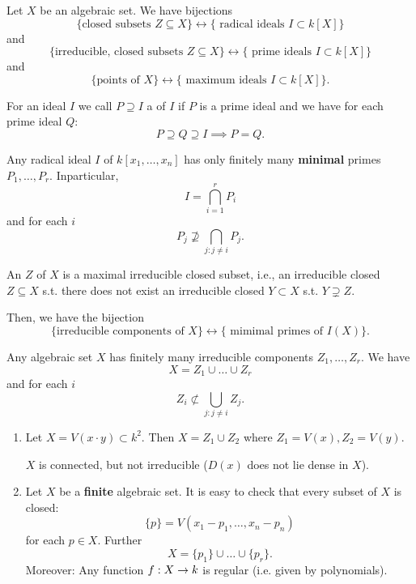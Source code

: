 \begin{lemma}
	Let $X$ be an algebraic set. We have bijections
	\[
	\{ \text{closed subsets } Z \subseteq X\} \leftrightarrow \{ \text{ radical ideals } I \subset k[X]\}
	\]
	and
	\[
	\{ \text{irreducible, closed subsets } Z \subseteq X\} \leftrightarrow \{ \text{ prime ideals } I \subset k[X]\}
	\]
		and
	\[
	\{ \text{points of } X\} \leftrightarrow \{ \text{ maximum ideals } I \subset k[X]\}.
	\]
\end{lemma}
\begin{lemma}
For an ideal $I$ we call $P \supseteq I$ a  of $I$ if $P$ is a prime ideal and we have for each prime ideal $Q$:
\[ P \supseteq Q \supseteq I \implies P = Q. \]

Any radical ideal $I $ of $k[x_1, \ldots, x_n]$ has only finitely many \textbf{minimal} primes $P_1,\ldots, P_r$.
Inparticular,
\[ I = \bigcap_{i=1}^r P_i \]
and for each $i$
\[ P_j \not \supseteq \bigcap_{j : j \neq i} P_j. \]
\end{lemma}

\begin{definition}
An  $Z$ of $X$ is a maximal irreducible closed subset, i.e., an irreducible closed $Z \subseteq X$ s.t. there does not exist an irreducible closed $Y \subset X$ s.t. $Y \supsetneq Z$.

Then, we have the bijection
	\[
\{ \text{irreducible components of } X\} \leftrightarrow \{ \text{ mimimal primes of } I(X)\}.
\]
\end{definition}

\begin{lemma}
Any algebraic set $X$ has finitely many irreducible components $Z_1, \ldots, Z_r$. We have
\[ X = Z_1 \cup \ldots \cup Z_r \]
and for each $i$
\[ Z_i \not \subset \bigcup_{j : j \neq i}Z_j. \]
\end{lemma}

\begin{example}
	\begin{enumerate}
		\item 	Let $X = V(x\cdot y) \subset k^2$. Then $X = Z_1\cup Z_2$ where $Z_1 = V(x), Z_2 = V(y)$.
		
		$X$ is connected, but not irreducible ($D(x)$ does not lie dense in $X$).
		\item Let $X$ be a \textbf{finite} algebraic set. It is easy to check that every subset of $X$ is closed:
		\[ \{p\} = V(x_1-p_1, \ldots, x_n-p_n) \]
		for each $p \in X$. Further
		\[ X = \{p_1\}\cup \ldots \cup \{p_r\}. \]
		Moreover: Any function $f : X \overset{}{\rightarrow} k$ is regular (i.e. given by polynomials).
	\end{enumerate}
\end{example}

